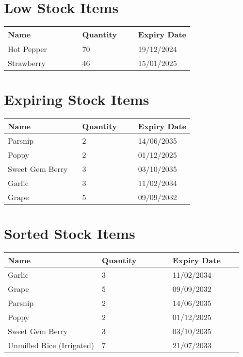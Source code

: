 \documentclass{article}
\begin{document}
\vspace*{-1in}
\section*{Low Stock Items}
\noindent\hspace*{-\oddsidemargin}\begin{tabular}{|p{0.4\linewidth}|p{0.3\linewidth}|p{0.3\linewidth}|}
\hline
\textbf{Name} & \textbf{Quantity} & \textbf{Expiry Date}\\
\hline
Hot Pepper & 70 & 19/12/2024 \\
\hline
Strawberry & 46 & 15/01/2025 \\
\hline
\end{tabular}

\section*{Expiring Stock Items}
\noindent\hspace*{-\oddsidemargin}\begin{tabular}{|p{0.4\linewidth}|p{0.3\linewidth}|p{0.3\linewidth}|}
\hline
\textbf{Name} & \textbf{Quantity} & \textbf{Expiry Date}\\
\hline
Parsnip & 2 & 14/06/2035 \\
\hline
Poppy & 2 & 01/12/2025 \\
\hline
Sweet Gem Berry & 3 & 03/10/2035 \\
\hline
Garlic & 3 & 11/02/2034 \\
\hline
Grape & 5 & 09/09/2032 \\
\hline
\end{tabular}

\section*{Sorted Stock Items}
\noindent\hspace*{-\oddsidemargin}\begin{tabular}{|p{0.4\linewidth}|p{0.3\linewidth}|p{0.3\linewidth}|}
\hline
\textbf{Name} & \textbf{Quantity} & \textbf{Expiry Date}\\
\hline
Garlic & 3 & 11/02/2034 \\
\hline
Grape & 5 & 09/09/2032 \\
\hline
Parsnip & 2 & 14/06/2035 \\
\hline
Poppy & 2 & 01/12/2025 \\
\hline
Sweet Gem Berry & 3 & 03/10/2035 \\
\hline
Unmilled Rice (Irrigated) & 7 & 21/07/2033 \\
\hline
\end{tabular}
\end{document}
